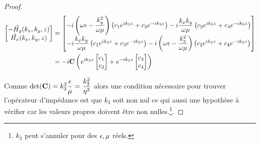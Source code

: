 \begin{proof}
        \begin{align}
            \begin{bmatrix}
                -\hat{H_y}(k_x,k_y,z)\\
                \hat{H_x}(k_x,k_y,z)\\
            \end{bmatrix}
            &=
            \begin{bmatrix}
                -i\left(\omega\epsilon - \dfrac{k_y^2}{\omega\mu}\right) \left( c_1 e^{ik_3 z} + c_3 e^{-ik_3 z} \right) - i\dfrac{k_xk_y}{\omega\mu} \left( c_2 e^{ik_3 z} + c_4 e^{-ik_3 z} \right)
                \\
                -i\dfrac{k_xk_y}{\omega\mu} \left( c_1 e^{ik_3 z} + c_3 e^{-ik_3 z} \right) - i\left(\omega\epsilon - \dfrac{k_x^2}{\omega\mu}\right)\left( c_2 e^{ik_3 z} + c_4 e^{-ik_3 z} \right)
            \end{bmatrix} \\
            &=-i
            \mathbf{C}
            \left(
                e^{ik_3 z}
                \begin{bmatrix}
                    c_1 \\
                    c_2
                \end{bmatrix}
                +e^{-ik_3 z}
                \begin{bmatrix}
                    c_3 \\
                    c_4
                \end{bmatrix}
            \right)
        \end{align}

        Comme \(\det(\mathbf{C}) = k_3^2\dfrac{\epsilon}{\mu}=\dfrac{k_3^2}{\eta^2}\) alors une condition nécessaire pour trouver l'opérateur d'impédance est que \(k_3\) soit non nul ce qui aussi une hypothèse à vérifier car les valeurs propres doivent être non nulles.\footnote{\(k_3\) peut s'annuler pour des \(\epsilon,\mu\) réels.}.

    \end{proof}





